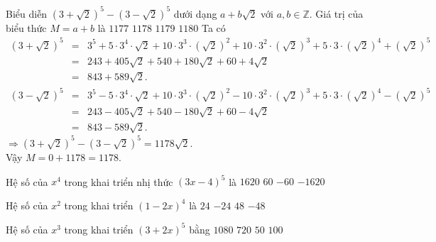 	\begin{ex}%
Biểu diễn $\left (3+\sqrt{2} \right )^5-\left (3-\sqrt{2} \right )^5$ dưới dạng $a+b\sqrt{2}$ với $a,b\in\mathbb{Z}$. Giá trị của biểu thức $M=a+b$ là
\choice
{$1177$}
{\True  $1178$}
{$1179$}
{$1180$}
\loigiai
{
Ta có
\begin{eqnarray*}
\left (3+\sqrt{2} \right )^5&=&3^5+5\cdot 3^4\cdot\sqrt{2}+10\cdot 3^3\cdot\left (\sqrt{2} \right )^2+10\cdot 3^2\cdot\left (\sqrt{2} \right )^3+5\cdot 3\cdot\left (\sqrt{2} \right )^4+\left (\sqrt{2} \right )^5\\&=&243+405\sqrt{2}+540+180\sqrt{2}+60+4\sqrt{2}\\
&=&843+589\sqrt{2}.
\end{eqnarray*}
\begin{eqnarray*}
\left (3-\sqrt{2} \right )^5&=&3^5-5\cdot 3^4\cdot\sqrt{2}+10\cdot 3^3\cdot\left (\sqrt{2} \right )^2-10\cdot 3^2\cdot\left (\sqrt{2} \right )^3+5\cdot 3\cdot\left (\sqrt{2} \right )^4-\left (\sqrt{2} \right )^5\\&=&243-405\sqrt{2}+540-180\sqrt{2}+60-4\sqrt{2}\\
&=&843-589\sqrt{2}.
\end{eqnarray*}
$\Rightarrow \left (3+\sqrt{2} \right )^5-\left (3-\sqrt{2} \right )^5=1178\sqrt{2}$.\\
Vậy $M=0+1178=1178$.
}
\end{ex}
\begin{ex}%
Hệ số của $x^4$ trong khai triển nhị thức $(3 x-4)^5$ là
\choice
{$1620 $}
{$60$}
{$-60$}
{\True $-1620$}
\end{ex}
\begin{ex}%
Hệ số của $x^2$ trong khai triển $(1-2x)^4$ là
\choice
{\True $24$}
{$-24$}
{$48$}
{$-48$}
\end{ex}
\begin{ex}%
Hệ số của $x^3$ trong khai triển $(3+2x)^5$ bằng
\choice
{$1080$}
{\True $720$}
{$50$}
{$100$}
\end{ex}

